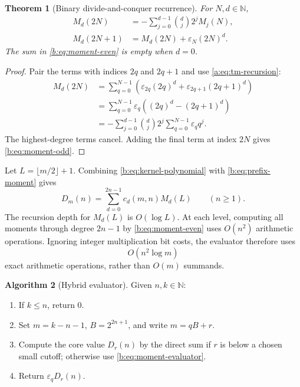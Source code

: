 \documentclass[11pt,a4paper,oneside,openany]{book}
\numberwithin{equation}{chapter}
\newtheorem{theorem}{Theorem}[chapter]
\theoremstyle{definition}
\newtheorem{algorithm}[theorem]{Algorithm}
\theoremstyle{remark}
\newcommand{\N}{\mathbb N}
\newcommand{\eps}{\varepsilon}
\newcommand{\Diag}{D}
\begin{document}
\begin{theorem}[Binary divide-and-conquer recurrence]
\label{b:thm:moment-recurrence}
For $N,d\in\N$,
\begin{align}
 M_d(2N)
 &=-\sum_{j=0}^{d-1}\binom dj2^jM_j(N),
 \label{b:eq:moment-even}\\
 M_d(2N+1)
 &=M_d(2N)+\eps_N(2N)^d.
 \label{b:eq:moment-odd}
\end{align}
The sum in \eqref{b:eq:moment-even} is empty when $d=0$.
\end{theorem}

\begin{proof}
Pair the terms with indices $2q$ and $2q+1$ and use
\eqref{a:eq:tm-recursion}:
\begin{align*}
 M_d(2N)
 &=\sum_{q=0}^{N-1}
   \left(\eps_{2q}(2q)^d+\eps_{2q+1}(2q+1)^d\right)\\
 &=\sum_{q=0}^{N-1}\eps_q\left((2q)^d-(2q+1)^d\right)\\
 &=-\sum_{j=0}^{d-1}\binom dj2^j
     \sum_{q=0}^{N-1}\eps_qq^j.
\end{align*}
The highest-degree terms cancel.  Adding the final term at index $2N$ gives
\eqref{b:eq:moment-odd}.
\end{proof}

Let $L=\lfloor m/2\rfloor+1$.  Combining
\eqref{b:eq:kernel-polynomial} with \eqref{b:eq:prefix-moment} gives
\begin{equation}
 \boxed{\quad
 \Diag_m(n)=\sum_{d=0}^{2n-1}c_d(m,n)M_d(L)
 \qquad(n\ge1).
 \quad}
 \label{b:eq:moment-evaluator}
\end{equation}
The recursion depth for $M_d(L)$ is $O(\log L)$.  At each level, computing
all moments through degree $2n-1$ by \eqref{b:eq:moment-even} uses
$O(n^2)$ arithmetic operations.  Ignoring integer multiplication bit costs,
the evaluator therefore uses
\begin{equation}
 O(n^2\log m)
 \label{b:eq:moment-complexity}
\end{equation}
exact arithmetic operations, rather than $O(m)$ summands.

\begin{algorithm}[Hybrid evaluator]
\label{b:alg:hybrid}
Given $n,k\in\N$:
\begin{enumerate}
 \item If $k\le n$, return $0$.
 \item Set $m=k-n-1$, $B=2^{2n+1}$, and write $m=qB+r$.
 \item Compute the core value $\Diag_r(n)$ by the direct sum if $r$ is below
       a chosen small cutoff; otherwise use \eqref{b:eq:moment-evaluator}.
 \item Return $\eps_q\Diag_r(n)$.
\end{enumerate}
\end{algorithm}
\end{document}
